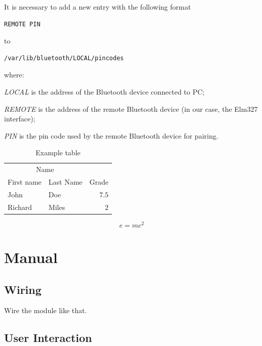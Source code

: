 \documentclass[twoside]{article}
\begin{document}
\begin{multicols}{2}
It is necessary to add a new entry with the following format
\begin{lstlisting}[language=bash]
REMOTE PIN
\end{lstlisting}
to
\begin{lstlisting}[language=bash]
/var/lib/bluetooth/LOCAL/pincodes
\end{lstlisting}
where:
\begin{compactitem}
\item \emph{LOCAL} is the address of the Bluetooth device connected to PC;
\item \emph{REMOTE} is the address of the remote Bluetooth device (in our case, the Elm327 interface);
\item \emph{PIN} is the pin code used by the remote Bluetooth device for pairing.
\end{compactitem}

\begin{table}[H]
\caption{Example table}
\centering
\begin{tabular}{llr}
\toprule
\multicolumn{2}{c}{Name} \\
\cmidrule(r){1-2}
First name & Last Name & Grade \\
\midrule
John & Doe & $7.5$ \\
Richard & Miles & $2$ \\
\bottomrule
\end{tabular}
\end{table}

\lipsum[5] %

\begin{equation}
\label{eq:emc}
e = mc^2
\end{equation}

\lipsum[6] %


\section{Manual}

\subsection{Wiring}

Wire the module like that.

\subsection{User Interaction}


\end{multicols}
\end{document}
